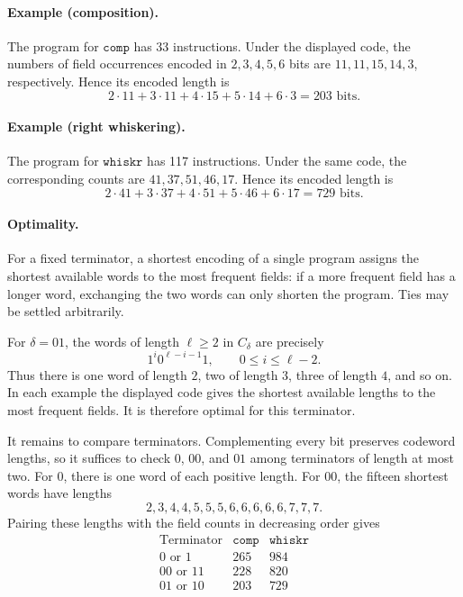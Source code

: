 \documentclass{article}%
\theoremstyle{remark}
\theoremstyle{definition}
\theoremstyle{definition}
\theoremstyle{plain}
\begin{document}
\paragraph{Example (composition).}
The program for $\mathtt{comp}$ has 33 instructions. Under the displayed code,
the numbers of field occurrences encoded in $2,3,4,5,6$ bits are
$11,11,15,14,3$, respectively. Hence its encoded length is
\[
  2\cdot11+3\cdot11+4\cdot15+5\cdot14+6\cdot3
  =203\text{ bits}.
\]

\paragraph{Example (right whiskering).}
The program for $\mathtt{whiskr}$ has 117 instructions. Under the same code, the
corresponding counts are $41,37,51,46,17$. Hence its encoded length is
\[
  2\cdot41+3\cdot37+4\cdot51+5\cdot46+6\cdot17
  =729\text{ bits}.
\]

\paragraph{Optimality.}
For a fixed terminator, a shortest encoding of a single program assigns the
shortest available words to the most frequent fields: if a more frequent field
has a longer word, exchanging the two words can only shorten the program. Ties
may be settled arbitrarily.

For $\delta=01$, the words of length $\ell\ge2$ in $C_\delta$ are
precisely
\[
  1^i0^{\ell-i-1}1,\qquad 0\le i\le\ell-2.
\]
Thus there is one word of length $2$, two of length $3$, three of length $4$,
and so on. In each example the displayed code gives the shortest available
lengths to the most frequent fields. It is therefore optimal for this
terminator.

It remains to compare terminators. Complementing every bit preserves codeword
lengths, so it suffices to check $0$, $00$, and $01$ among terminators of length
at most two. For $0$, there is one word of each positive length. For $00$, the
fifteen shortest words have lengths
\[
  2,3,4,4,5,5,5,6,6,6,6,6,7,7,7.
\]
Pairing these lengths with the field counts in decreasing order gives
\[
\begin{array}{c|rr}
  \text{Terminator} & \mathtt{comp} & \mathtt{whiskr}\\
  \hline
  0  \text{ or } 1  & 265 & 984\\
  00 \text{ or } 11 & 228 & 820\\
  01 \text{ or } 10 & 203 & 729
\end{array}
\]
\end{document}

